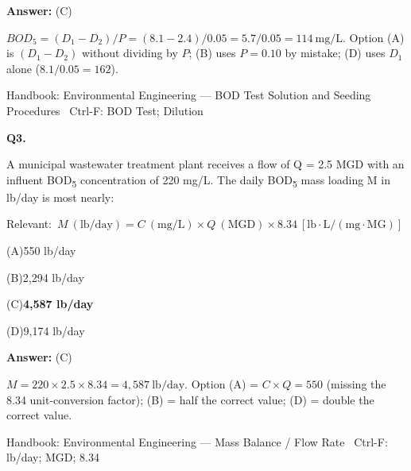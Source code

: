 \documentclass[11pt]{article}
\newcommand{\correct}[1]{\textbf{#1}\;{\color{accent}$\checkmark$}}
\newcommand{\optline}[2]{\par\noindent\hspace{1.2em}(#1)\hspace{0.6em}#2}
\begin{document}
\vspace{2pt}\par\noindent\colorbox{boxbg}{\parbox{\dimexpr\linewidth-2\fboxsep\relax}{%
\vspace{2pt}\textbf{Answer:} (C)\par\vspace{2pt}
{\small $BOD_5 = (D_1 - D_2)/P = (8.1 - 2.4)/0.05 = 5.7/0.05 = 114\ \mathrm{mg/L}$. Option (A) is $(D_1-D_2)$ without dividing by $P$; (B) uses $P = 0.10$ by mistake; (D) uses $D_1$ alone ($8.1/0.05 = 162$).}\par\vspace{2pt}
{\footnotesize\color{soft}Handbook: Environmental Engineering --- BOD Test Solution and Seeding Procedures \textbullet\ Ctrl-F: BOD Test; Dilution}\vspace{2pt}
}}
\vspace{9pt}
\filbreak
\textbf{\color{accent}Q3.}\par\vspace{2pt}
A municipal wastewater treatment plant receives a flow of Q = 2.5 MGD with an influent BOD\textsubscript{5} concentration of 220 mg/L. The daily BOD\textsubscript{5} mass loading M in lb/day is most nearly:\par\vspace{3pt}
{\small\color{soft}Relevant:}\ $M\ (\mathrm{lb/day}) = C\ (\mathrm{mg/L})\times Q\ (\mathrm{MGD})\times 8.34\ [\mathrm{lb\cdot L/(mg\cdot MG)}]$\par\vspace{3pt}
\optline{A}{550 lb/day}
\optline{B}{2,294 lb/day}
\optline{C}{\correct{4,587 lb/day}}
\optline{D}{9,174 lb/day}
\par\vspace{3pt}
\vspace{2pt}\par\noindent\colorbox{boxbg}{\parbox{\dimexpr\linewidth-2\fboxsep\relax}{%
\vspace{2pt}\textbf{Answer:} (C)\par\vspace{2pt}
{\small $M = 220\times 2.5\times 8.34 = 4{,}587\ \mathrm{lb/day}$. Option (A) = $C\times Q = 550$ (missing the 8.34 unit-conversion factor); (B) = half the correct value; (D) = double the correct value.}\par\vspace{2pt}
{\footnotesize\color{soft}Handbook: Environmental Engineering --- Mass Balance / Flow Rate \textbullet\ Ctrl-F: lb/day; MGD; 8.34}\vspace{2pt}
}}
\end{document}
